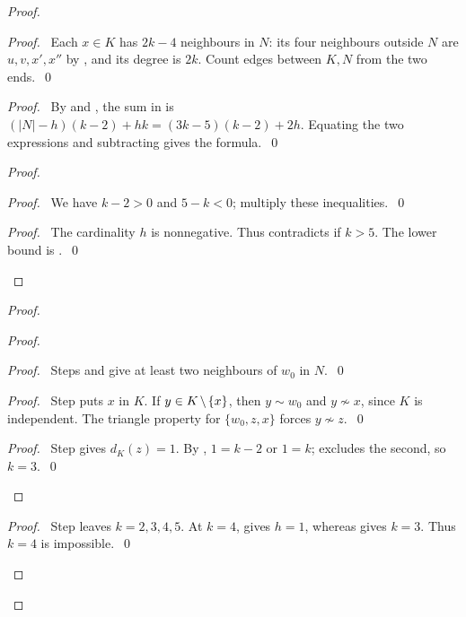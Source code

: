 \begin{proof}
 \begin{proof}
  \pf\ Each $x\in K$ has $2k-4$ neighbours in $N$: its four neighbours outside $N$
  are $u,v,x',x''$ by , and its degree is $2k$.
  Count edges between $K,N$ from the two ends.~\qed
 \end{proof}
 \begin{proof}
  \pf\ By  and , the sum in  is
  $(|N|-h)(k-2)+hk=(3k-5)(k-2)+2h$.
  Equating the two expressions and subtracting gives the formula.~\qed
 \end{proof}
 \begin{proof}
  \begin{proof}\pf\ We have $k-2>0$ and $5-k<0$; multiply these inequalities.~\qed\end{proof}
  \qedstep
  \begin{proof}
   \pf\ The cardinality $h$ is nonnegative. Thus  contradicts
    if $k>5$. The lower bound is .~\qed
  \end{proof}
 \end{proof}
 \begin{proof}
  \begin{proof}
   \begin{proof}\pf\ Steps  and  give at least two neighbours of $w_0$ in $N$.~\qed\end{proof}
   \begin{proof}
    \pf\ Step  puts $x$ in $K$.
    If $y\in K\mathbin{\mkern-1.5mu\setminus\mkern-1.5mu}\{x\}$, then $y\sim w_0$ and $y\not\sim x$, since $K$ is independent.
    The triangle property for $\{w_0,z,x\}$ forces $y\not\sim z$.~\qed
   \end{proof}
   \qedstep
   \begin{proof}
    \pf\ Step  gives $d_K(z)=1$.
    By , $1=k-2$ or $1=k$;  excludes the second,
    so $k=3$.~\qed
   \end{proof}
  \end{proof}
  \qedstep
  \begin{proof}
   \pf\ Step  leaves $k=2,3,4,5$.
   At $k=4$,  gives $h=1$, whereas
    gives $k=3$. Thus $k=4$ is impossible.~\qed
  \end{proof}
 \end{proof}


\end{proof}
